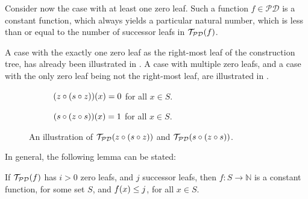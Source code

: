 Consider now the case with at least one zero leaf. Such a function $f \in
\mathcal{PD}$ is a constant function, which always yields a particular natural
number, which is less than or equal to the number of successor leafs in
$\mathcal{T}_\mathcal{PD}{\mathopen{}\left({f}\right)\mathclose{}}$.

A case with the exactly one zero leaf as the right-most leaf of the
construction tree, has already been illustrated in . A
case with multiple zero leafs, and a case with the only zero leaf being not the
right-most leaf, are illustrated in .

\begin{figure}[h!]
\centering
%
\begin{subfigure}{0.49\textwidth}
\centering
{}
\caption[]{${\mathopen{}\left({z \circ {\ensuremath{\mathopen{}\left({s \circ z}\right)\mathclose{}}}}\right)\mathclose{}}{\mathopen{}\left({x}\right)\mathclose{}} = 0$ for all $x \in S$.}
\end{subfigure}
%
\begin{subfigure}{0.49\textwidth}
\centering
{}
\caption[]{${\mathopen{}\left({s \circ {\ensuremath{\mathopen{}\left({z \circ s}\right)\mathclose{}}}}\right)\mathclose{}}{\mathopen{}\left({x}\right)\mathclose{}} = 1$ for all $x \in S$.}
\end{subfigure}
%
\caption[]{An illustration of $\mathcal{T}_\mathcal{PD}{\mathopen{}\left({z \circ {\ensuremath{\mathopen{}\left({s \circ
z}\right)\mathclose{}}}}\right)\mathclose{}}$ and $\mathcal{T}_\mathcal{PD}{\mathopen{}\left({s \circ {\ensuremath{\mathopen{}\left({z \circ s}\right)\mathclose{}}}}\right)\mathclose{}}$.}
\label{fig:fancy-zero-leafs}
\end{figure}

In general, the following lemma can be stated:

\begin{lemma} \label{lem:p-at-least-one-zero} If
$\mathcal{T}_\mathcal{PD}{\mathopen{}\left({f}\right)\mathclose{}}$ has $i > 0$ zero leafs, and $j$ successor
leafs, then $f : S \rightarrow \mathbb{N}$ is a constant function, for some set
$S$, and $f{\mathopen{}\left({x}\right)\mathclose{}} \leq j$, for all $x \in S$.  \end{lemma}

